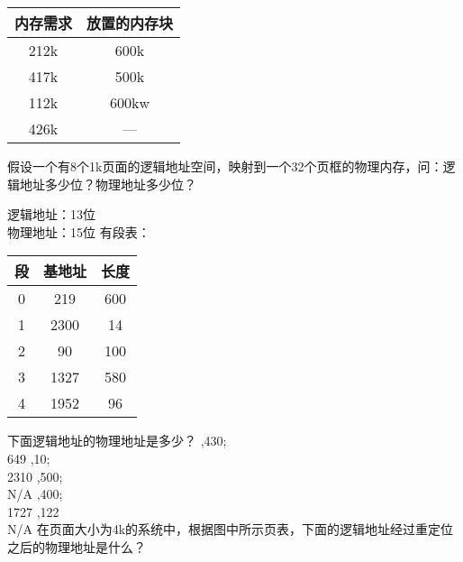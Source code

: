 \documentclass{ctexart}
\begin{document}
\begin{outline}[enumerate]
\begin{multicols}{3}
            \begin{center}
                \begin{tabular}{c c}
                    \toprule
                    内存需求 & 放置的内存块 \\
                    \midrule
                    212k & 600k \\
                    417k & 500k \\
                    112k & 600kw \\
                    426k & --- \\
                    \bottomrule
                \end{tabular}
            \end{center}
        \end{multicols}
    \1 假设一个有8个1k页面的逻辑地址空间，映射到一个32个页框的物理内存，问：逻辑地址多少位？物理地址多少位？
        
        逻辑地址：13位 \\
        物理地址：15位
    \1 有段表：
        \begin{center}
            \begin{tabular}{ccc} 
                \toprule
                段 & 基地址  & 长度   \\
                \midrule
                0 & 219  & 600  \\
                1 & 2300 & 14   \\
                2 & 90   & 100  \\
                3 & 1327 & 580  \\
                4 & 1952 & 96   \\
                \bottomrule
                \end{tabular}
        \end{center}
        下面逻辑地址的物理地址是多少？
        ,430; \\
            649
        ,10; \\
            2310
        ,500; \\
            N/A
        ,400; \\
            1727
        ,122 \\
            N/A
    \1 在页面大小为4k的系统中，根据图中所示页表，下面的逻辑地址经过重定位之后的物理地址是什么？
    

\end{outline}
\end{document}
